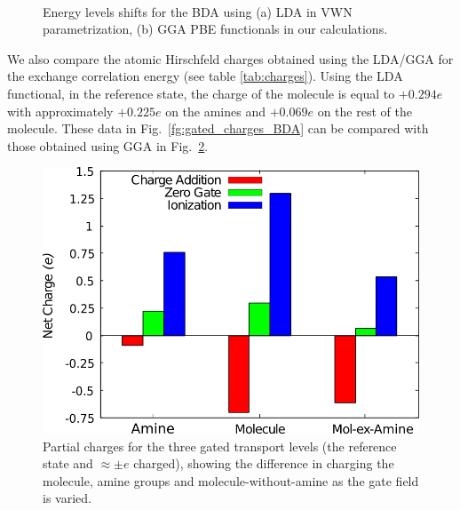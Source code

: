 \documentclass[aip,jcp,a4paper,reprint,floatfix,superscriptaddress]{revtex4-1}
\begin{document}
\begin{figure}
\\
\caption{Energy levels shifts for the BDA using (a) LDA in VWN parametrization, (b) GGA PBE functionals in our calculations.}\label{fg:shifts-gates}
\end{figure}

We also compare the atomic Hirschfeld charges obtained using the LDA/GGA for the exchange correlation energy (see table \ref{tab:charges}). Using the LDA functional, in the reference state, the charge of the molecule is equal to $+0.294e$ with approximately $+0.225e$ on the amines and $+0.069e$ on the rest of the molecule. These data in Fig.~\ref{fg:gated_charges_BDA} can be compared with those obtained using GGA in Fig.~\ref{fg:gated_charges_BDA-LDA}.


\begin{figure}
\includegraphics[width=.5\columnwidth]{img/gating-BDA-LDA-N}
\caption{Partial charges for the three gated transport levels (the reference state and $\approx\pm e$ charged), showing the difference in charging the molecule, amine groups and molecule-without-amine as the gate field is varied.} \label{fg:gated_charges_BDA-LDA}
\end{figure}
\end{document}

